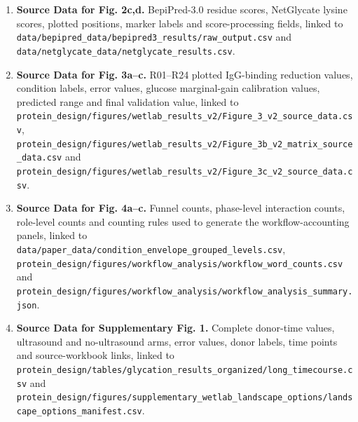 \begin{enumerate}
  \item \textbf{Source Data for Fig. 2c,d.}
  BepiPred-3.0 residue scores, NetGlycate lysine scores, plotted positions,
  marker labels and score-processing fields, linked to
  \nolinkurl{data/bepipred_data/bepipred3_results/raw_output.csv} and
  \nolinkurl{data/netglycate_data/netglycate_results.csv}.

  \item \textbf{Source Data for Fig. 3a--c.}
  R01--R24 plotted IgG-binding reduction values, condition labels, error values,
  glucose marginal-gain calibration values, predicted range and final validation
  value, linked to
  \nolinkurl{protein_design/figures/wetlab_results_v2/Figure_3_v2_source_data.csv},
  \nolinkurl{protein_design/figures/wetlab_results_v2/Figure_3b_v2_matrix_source_data.csv}
  and
  \nolinkurl{protein_design/figures/wetlab_results_v2/Figure_3c_v2_source_data.csv}.

  \item \textbf{Source Data for Fig. 4a--c.}
  Funnel counts, phase-level interaction counts, role-level counts and counting
  rules used to generate the workflow-accounting panels, linked to
  \nolinkurl{data/paper_data/condition_envelope_grouped_levels.csv},
  \nolinkurl{protein_design/figures/workflow_analysis/workflow_word_counts.csv}
  and
  \nolinkurl{protein_design/figures/workflow_analysis/workflow_analysis_summary.json}.

  \item \textbf{Source Data for Supplementary Fig. 1.}
  Complete donor-time values, ultrasound and no-ultrasound arms, error values,
  donor labels, time points and source-workbook links, linked to
  \nolinkurl{protein_design/tables/glycation_results_organized/long_timecourse.csv}
  and
  \nolinkurl{protein_design/figures/supplementary_wetlab_landscape_options/landscape_options_manifest.csv}.
\end{enumerate}

